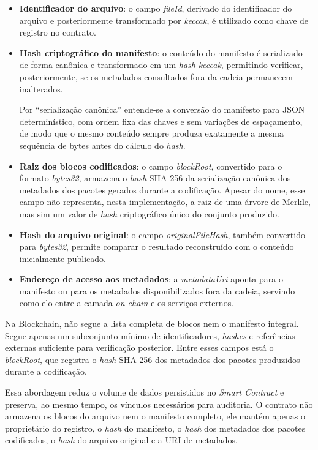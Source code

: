 \begin{itemize}
    \item \textbf{Identificador do arquivo}: o campo \emph{fileId},
    derivado do identificador do arquivo e posteriormente
    transformado por \emph{keccak}, é utilizado como chave de registro no
    contrato.
    \item \textbf{Hash criptográfico do manifesto}: o conteúdo do
    manifesto é serializado de forma canônica e transformado em um
    \emph{hash} \emph{keccak}, permitindo verificar, posteriormente,
    se os metadados consultados fora da cadeia permanecem inalterados.

    Por ``serialização canônica'' entende-se a conversão do
    manifesto para JSON determinístico, com ordem fixa das chaves e
    sem variações de espaçamento, de modo que o mesmo conteúdo sempre
    produza exatamente a mesma sequência de bytes antes do cálculo do
    \emph{hash}.
    \item \textbf{Raiz dos blocos codificados}: o campo
    \emph{blockRoot}, convertido para o formato \emph{bytes32},
    armazena o \emph{hash} SHA-256 da serialização canônica dos
    metadados dos pacotes gerados durante a codificação. Apesar do
    nome, esse campo não representa, nesta implementação, a raiz de
    uma árvore de Merkle, mas sim um valor de \emph{hash} criptográfico único do
    conjunto produzido.
    \item \textbf{Hash do arquivo original}: o campo
    \emph{originalFileHash}, também convertido para \emph{bytes32},
    permite comparar o resultado reconstruído com o conteúdo
    inicialmente publicado.
    \item \textbf{Endereço de acesso aos metadados}: a
    \emph{metadataUri} aponta para o manifesto ou para os metadados
    disponibilizados fora da cadeia, servindo como elo entre a camada
    \emph{on-chain} e os serviços externos.
\end{itemize}

Na Blockchain, não segue a lista completa de blocos nem o manifesto
integral. Segue apenas um subconjunto mínimo de identificadores,
\emph{hashes} e
referências externas suficiente para verificação posterior. Entre
esses campos está o \emph{blockRoot}, que registra o \emph{hash}
SHA-256 dos metadados dos pacotes produzidos durante a codificação.

Essa abordagem reduz o volume de dados persistidos no
\emph{Smart Contract} e preserva, ao mesmo tempo, os vínculos
necessários para auditoria. O contrato não armazena os blocos do
arquivo nem o manifesto completo, ele mantém apenas o proprietário do
registro, o \emph{hash} do manifesto, o \emph{hash} dos metadados dos
pacotes codificados, o
\emph{hash} do arquivo original e a URI de metadados.

